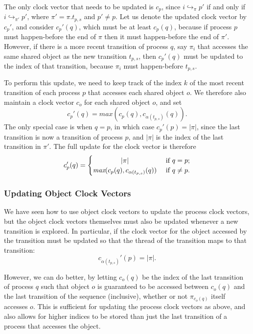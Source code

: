 \documentclass[12pt,a4paper,twoside,openany]{report}
\begin{document}
The only clock vector that needs to be updated
is $c_p$, since $i \hookrightarrow_\pi p'$ if
and only if $i \hookrightarrow_{\pi'} p'$,
where $\pi' = \pi.t_{p,s}$ and $p' \neq p$.
Let us denote the updated clock vector
by $c_p'$, and consider $c_p'(q)$, which
must be at least $c_p(q)$, because if process
$p$ must happen-before the end of $\pi$
then it must happen-before the end of $\pi'$.
However, if there is a more recent transition
of process $q$, say $\pi_i$
that accesses the same shared
object as the new transition $t_{p,s}$, then
$c_p'(q)$ must be updated to the index of
that transition, because $\pi_i$ must
happen-before $t_{p,s}$.

To perform this update, we need to keep
track of the index $k$ of the most recent
transition of each process $p$ that
accesses each shared object $o$. We therefore
also maintain a clock vector $c_o$ for each
shared object $o$, and set
\[ c_p'(q) =\textit{max}(c_p(q),
		c_{\alpha(t_{p,s})}(q)).\]
The only special case is when $q = p$,
in which case $c_p'(p) = |\pi|$, since
the last transition is now a transition of
process $p$, and $|\pi|$ is the index
of the last transition in $\pi'$. The
full update for the clock vector is therefore
\[ c_p'(q) =
\begin{cases}
	\hfill |\pi| \hfill & \text{ if } q = p; \\
	\hfill \textit{max}(c_p(q),
		c_{\alpha(t_{p,s})}(q))
		\hfill & \text{ if } q \neq p.
\end{cases}\]


\subsubsection{Updating Object Clock Vectors}

We have seen how to use object clock vectors to
update the process clock vectors, but
the object clock vectors themselves must also be
updated whenever a new transition is explored.
In particular, if the clock vector for the
object accessed by the transition must be
updated so that the thread of the transition
maps to that transition:
\[c_{\alpha(t_{p,s})}'(p) = |\pi|.\]

However, we can do better, by letting
$c_o(q)$ be the index of the
last transition of process
$q$ such that object $o$ is guaranteed to be
accessed between $c_o(q)$ and the last
transition of the sequence (inclusive),
whether or not $\pi_{c_o(q)}$ itself
accesses $o$.
This is sufficient for updating the
process clock vectors as above, and
also allows for higher indices to
be stored than just the last
transition of a process that
accesses the object.
\end{document}
